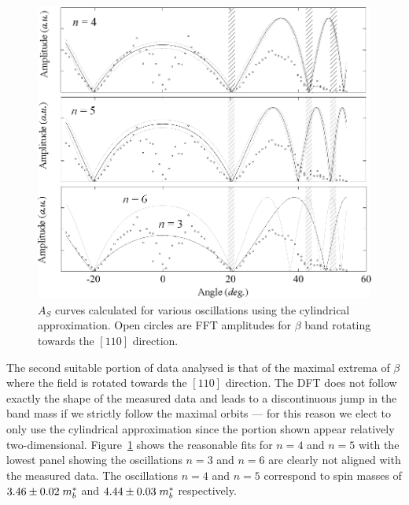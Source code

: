 \begin{figure}[htbp]
    \begin{center}
        \includegraphics[scale=0.75]{Chapter-dHvABaFe2P2/Figures/Mass/SpinMassBand3Cylindrical/SpinMassBand3Cylindrical_110}
        \caption{$A_S$ curves calculated for various oscillations using the cylindrical approximation. Open circles are \ac{FFT} amplitudes for $\beta$ band rotating towards the $[110]$ direction.}
        \label{Fig:ResD:SpinMassFromDFTBand3}
    \end{center}
\end{figure}
The second suitable portion of data analysed is that of the maximal extrema of $\beta$ where the field is rotated towards the $[110]$ direction. The \ac{DFT} does not follow exactly the shape of the measured data and leads to a discontinuous jump in the band mass if we strictly follow the maximal orbits --- for this reason we elect to only use the cylindrical approximation since the portion shown appear relatively two-dimensional. Figure~\ref{Fig:ResD:SpinMassFromDFTBand3} shows the reasonable fits for $n=4$ and $n=5$ with the lowest panel showing the oscillations $n=3$ and $n=6$ are clearly not aligned with the measured data. The oscillations $n=4$ and $n=5$ correspond to spin masses of $3.46\pm0.02\; m^*_b$ and $4.44\pm0.03\; m^*_b$ respectively.


